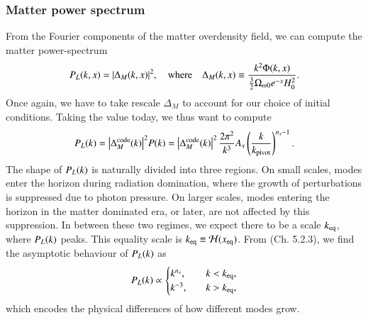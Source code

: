 \subsubsection{Matter power spectrum} \label{sssec:M4:theory:matter_power_spectrum}
From the Fourier components of the matter overdensity field, we can compute the matter power-spectrum
\begin{equation} \label{eq:M4:theory:MatterPS_of_x_k}
    P_L(k,x) = \abs{\Delta_M(k,x)}^2,\quad \text{where}\quad \Delta_M(k,x) \equiv \frac{k^2 \Phi(k,x)}{\frac{3}{2}\Omega_{m0} e^{-x} H_0^2}.
\end{equation}
Once again, we have to take rescale $\Delta_M$ to account for our choice of initial conditions. Taking the value today, we thus want to compute 
\begin{equation} \label{eq:M4:theory:MatterPS_code_today}
    P_L(k) = \abs{\Delta_M^\mathrm{code}(k)}^2 P(k) = \abs{\Delta_M^\mathrm{code}(k)}^2\, \frac{2\pi^2}{k^3} A_s \left( \frac{k}{k_\mathrm{pivot}} \right)^{n_s-1}.
\end{equation}
The shape of $P_L(k)$ is naturally divided into three regions. On small scales, modes enter the horizon during radiation domination, where the growth of perturbations is suppressed due to photon pressure. On larger scales, modes entering the horizon in the matter dominated era, or later, are not affected by this suppression. In between these two regimes, we expect there to be a scale $k_\mathrm{eq}$, where $P_L(k)$ peaks. This equality scale is $k_\mathrm{eq}\equiv\mathcal{H}(x_\mathrm{eq})$. From \citeauthor{Baumann} (Ch. 5.2.3), we find the asymptotic behaviour of $P_L(k)$ as
\begin{equation} \label{eq:M4:theory:matter_power_spectrum_asymptotic_scaling}
    P_L(k) \propto \begin{cases}
        k^{n_s}     ,&\quad k<k_\mathrm{eq}, \\
        k^{-3},&\quad k>k_\mathrm{eq}, 
    \end{cases}
\end{equation}  
which encodes the physical differences of how different modes grow.   


